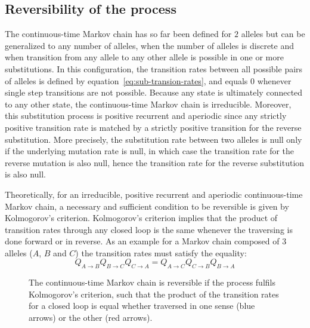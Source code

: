 \subsection{Reversibility of the process}
The continuous-time Markov chain has so far been defined for $2$ alleles but can be generalized to any number of alleles, when the number of alleles is discrete and when transition from any allele to any other allele is possible in one or more substitutions.
In this configuration, the transition rates between all possible pairs of alleles is defined by equation~\ref{eq:sub-transion-rates}, and equals $0$ whenever single step transitions are not possible.
Because any state is ultimately connected to any other state, the continuous-time Markov chain is irreducible.
Moreover, this substitution process is positive recurrent and aperiodic since any strictly positive transition rate is matched by a strictly positive transition for the reverse substitution.
More precisely, the substitution rate between two alleles is null only if the underlying mutation rate is null, in which case the transition rate for the reverse mutation is also null, hence the transition rate for the reverse substitution is also null.

Theoretically, for an irreducible, positive recurrent and aperiodic continuous-time Markov chain, a necessary and sufficient condition to be reversible is given by Kolmogorov's criterion.
Kolmogorov's criterion implies that the product of transition rates through any closed loop is the same whenever the traversing is done forward or in reverse.
As an example for a Markov chain composed of $3$ alleles ($A$, $B$ and $C$) the transition rates must satisfy the equality:
\begin{equation}
    Q_{A \to B}Q_{B \to C}Q_{C \to A} = Q_{A \to C}Q_{C \to B}Q_{B \to A}
\end{equation}

\begin{figure}[htb!]
    \centering
    \caption[Kolmogorov's criterion]{
    The continuous-time Markov chain is reversible if the process fulfils Kolmogorov's criterion, such that the product of the transition rates for a closed loop is equal whether traversed in one sense (blue arrows) or the other (red arrows).}
    \label{fig:reversible-circuit}%
\end{figure}

